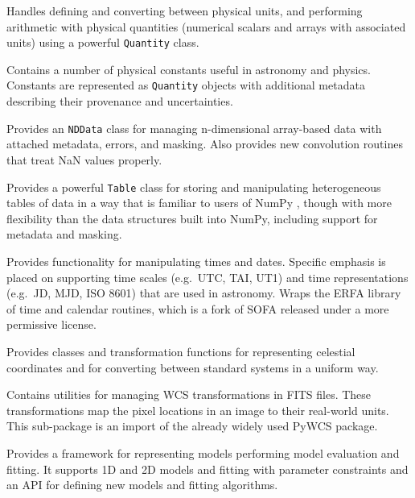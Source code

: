 \documentclass[11pt,twoside]{article}
\begin{document}
Handles defining and converting between physical units, and performing
arithmetic with physical quantities (numerical scalars and arrays with
associated units) using a powerful \texttt{Quantity} class.


Contains a number of physical constants useful in astronomy and physics.
Constants are represented as \texttt{Quantity} objects with additional metadata
describing their provenance and uncertainties.


Provides an \texttt{NDData} class for managing n-dimensional array-based data
with attached metadata, errors, and masking.  Also provides new convolution
routines that treat NaN values properly.


Provides a powerful \texttt{Table} class for storing and manipulating
heterogeneous tables of data in a way that is familiar to users of NumPy
\citep{oliphant2006guide,van2011numpy}, though with more flexibility than the
data structures built into NumPy, including support for metadata and masking.

Provides functionality for manipulating times and dates.  Specific emphasis is
placed on supporting time scales (e.g.~UTC, TAI, UT1) and time representations
(e.g.~JD, MJD, ISO 8601) that are used in astronomy.  Wraps the ERFA library of
time and calendar routines, which is a fork of SOFA \citep{Hohenkerk:2010}
released under a more permissive license.


Provides classes and transformation functions for representing celestial
coordinates and for converting between standard systems in a uniform way.


Contains utilities for managing WCS transformations in FITS files.  These
transformations map the pixel locations in an image to their real-world units.
This sub-package is an import of the already widely used PyWCS package.


Provides a framework for representing models performing model evaluation and
fitting.  It supports 1D and 2D models and fitting with parameter constraints
and an API for defining new models and fitting algorithms.
\end{document}

